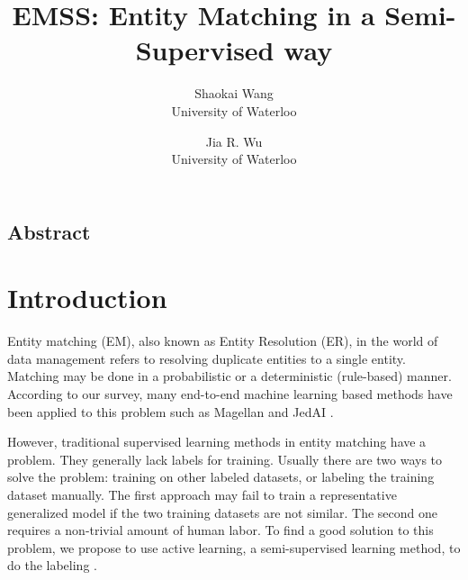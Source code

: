 \documentclass[letterpaper,twocolumn,10pt]{article}
\begin{document}
\date{}

\title{\Large \bf EMSS: Entity Matching in a Semi-Supervised way}




\author{
{\rm Shaokai Wang}\\
University of Waterloo
\and
{\rm Jia R. Wu}\\
University of Waterloo
} %

\maketitle

\thispagestyle{empty}


\subsection*{Abstract}



\section{Introduction}
Entity matching (EM), also known as Entity Resolution (ER), in the world of data management refers to resolving duplicate entities to a single entity. Matching may be done in a probabilistic or a deterministic (rule-based) manner. According to our survey, many end-to-end machine learning based methods have been applied to this problem such as Magellan and JedAI \cite{papadakis2018jedai}.

However, traditional supervised learning methods in entity matching have a problem. They generally lack labels for training. Usually there are two ways to solve the problem: training on other labeled datasets, or labeling the training dataset manually. The first approach may fail to train a representative generalized model if the two training datasets are not similar. The second one requires a non-trivial amount of human labor. To find a good solution to this problem, we propose to use active learning, a semi-supervised learning method, to do the labeling \cite{settles2009active}.
\end{document}
